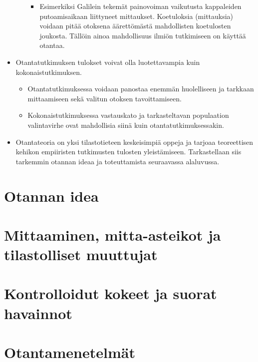 \documentclass[
]{book}
\providecommand{\tightlist}{%
  \setlength{\itemsep}{0pt}\setlength{\parskip}{0pt}}
\begin{document}
\begin{itemize}
\begin{itemize}
    \begin{itemize}
    \tightlist
    \item
      Esimerkiksi Galilein tekemät painovoiman vaikutusta kappaleiden putoamisaikaan liittyneet mittaukset. Koetuloksia (mittauksia) voidaan pitää otoksena äärettömästä mahdollisten koetulosten joukosta. Tällöin ainoa mahdollisuus ilmiön tutkimiseen on käyttää otantaa.
    \end{itemize}
  \end{itemize}
\item
  Otantatutkimuksen tulokset voivat olla luotettavampia kuin kokonaistutkimuksen.

  \begin{itemize}
  \tightlist
  \item
    Otantatutkimuksessa voidaan panostaa enemmän huolelliseen ja tarkkaan mittaamiseen sekä valitun otoksen tavoittamiseen.
  \item
    Kokonaistutkimuksessa vastauskato ja tarkasteltavan populaation valintavirhe ovat mahdollisia siinä kuin otantatutkimuksessakin.
  \end{itemize}
\item
  Otantateoria on yksi tilastotieteen keskeisimpiä oppeja ja tarjoaa teoreettisen kehikon empiiristen tutkimusten tulosten yleistämiseen. Tarkastellaan siis tarkemmin otannan ideaa ja toteuttamista seuraavassa alaluvussa.
\end{itemize}

\hypertarget{alaluku52}{%
\section{Otannan idea}\label{alaluku52}}

\hypertarget{alaluku53}{%
\section{Mittaaminen, mitta-asteikot ja tilastolliset muuttujat}\label{alaluku53}}

\hypertarget{alaluku54}{%
\section{Kontrolloidut kokeet ja suorat havainnot}\label{alaluku54}}

\hypertarget{alaluku55}{%
\section{Otantamenetelmät}\label{alaluku55}}
\end{document}

